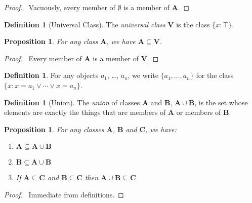 \documentclass{article}
\let\qed\relax
\newtheorem{proposition}[axiom]{Proposition}
\theoremstyle{definition}
\newtheorem{definition}[axiom]{Definition}
\begin{document}
    \begin{proof}
        \pf\ Vacuously, every member of $\emptyset$ is a member of $\mathbf{A}$.
    \end{proof}

    \begin{definition}[Universal Class]
        The \emph{universal class} $\mathbf{V}$ is the class $\{ x : \top \}$.
    \end{definition}

    \begin{proposition}
        For any class $\mathbf{A}$, we have $\mathbf{A} \subseteq \mathbf{V}$.
    \end{proposition}

    \begin{proof}
        \pf\ Every member of $\mathbf{A}$ is a member of $\mathbf{V}$. \qed
    \end{proof}

    \begin{definition}
        For any objects $a_1$, \ldots, $a_n$, we write $\{ a_1, \ldots, a_n \}$ for the class
        $\{ x : x = a_1 \vee \cdots \vee x = a_n \}$.
    \end{definition}

    \begin{definition}[Union]
        The \emph{union} of classes $\mathbf{A}$ and $\mathbf{B}$, 
        $\mathbf{A} \cup \mathbf{B}$, is the set whose elements are exactly the things
        that are members of $\mathbf{A}$ or members of $\mathbf{B}$.
    \end{definition}

    \begin{proposition}
        For any classes $\mathbf{A}$, $\mathbf{B}$ and $\mathbf{C}$, we have:
        \begin{enumerate}
            \item $\mathbf{A} \subseteq \mathbf{A} \cup \mathbf{B}$
            \item $\mathbf{B} \subseteq \mathbf{A} \cup \mathbf{B}$
            \item If $\mathbf{A} \subseteq \mathbf{C}$ and $\mathbf{B} \subseteq \mathbf{C}$
            then $\mathbf{A} \cup \mathbf{B} \subseteq \mathbf{C}$
        \end{enumerate}
    \end{proposition}

    \begin{proof}
        \pf\ Immediate from definitions. \qed
    \end{proof}
\end{document}
